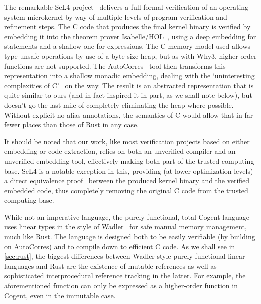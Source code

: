 The remarkable SeL4 project~\cite{klein2009sel4} delivers a full formal verification of an operating
system microkernel by way of multiple levels of program verification and
refinement steps. The C code that produces the final kernel binary is verified
by embedding it into the theorem prover
Isabelle/HOL~\cite{nipkow2002isabelle}, using a deep embedding for statements
and a shallow one for expressions. The C memory model used allows type-unsafe
operations by use of a byte-size heap, but as with Why3, higher-order functions are
not supported. The AutoCorres~\cite{greenaway2012bridging, greenaway2014don}
tool then transforms this representation into a shallow monadic embedding,
dealing with the `uninteresting complexities of C'~\cite{greenaway2014don} on the
way. The result is an abstracted representation that is quite similar to ours
(and in fact inspired it in part, as we shall note below), but doesn't go the
last mile of completely eliminating the heap where possible. Without explicit
no-alias annotations, the semantics of C would allow that in far fewer places than those
of Rust in any case.

It should be noted that our work, like most verification projects based on
either embedding or code extraction, relies on both
an unverified compiler and an unverified embedding tool, effectively making both
part of the trusted computing base. SeL4 is a notable exception in this,
providing (at lower optimization levels) a direct equivalence proof~\cite{sewell2013translation} between the
produced kernel binary and the verified embedded code, thus completely removing
the original C code from the trusted computing base.

While not an imperative language, the purely functional, total Cogent language~\cite{o2016refinement}
uses linear types in the style of Wadler~\cite{wadler1990linear} for safe
manual memory management, much like Rust. The language is designed both to be
easily verifiable (by building on AutoCorres) and to
compile down to efficient C code. As we shall see in \autoref{sec:rust}, the
biggest differences between Wadler-style purely functional linear languages and Rust are the
existence of mutable references as well as sophisticated interprocedural
reference tracking in the latter. For example, the aforementioned 
function can only be expressed as a higher-order function in Cogent, even in the immutable case.